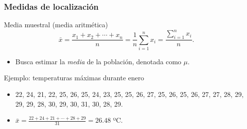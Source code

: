 \documentclass[table]{beamer}
\begin{document}
\begin{frame}
    \frametitle{Medidas de localización}
    \begin{block}{Media muestral (media aritmética)}
        \begin{equation*}
            \bar{x} = \frac{x_{1} + x_{2} + \cdots + x_{n}}{n} = \frac{1}{n} \sum_{i = 1}^{n} x_{i} = \frac{\sum_{i = 1}^{n} x_{i}}{n}.
        \end{equation*}
        \begin{itemize}
            \item Busca estimar la \emph{media} de la población, denotada como $\mu$.
        \end{itemize}
    \end{block}
    \begin{exampleblock}{Ejemplo: temperaturas máximas durante enero}
        \begin{itemize}
            \item 22, 24, 21, 22, 25, 26, 25, 24, 23, 25, 25, 26, 27, 25, 26, 25, 26, 27, 27, 28, 29, 29, 29, 28, 30, 29, 30, 31, 30, 28, 29.
            \item $\bar{x} = \frac{22 + 24 + 21 + \cdots + 28 + 29}{31} = 26.48$ ºC.
        \end{itemize}
    \end{exampleblock}
\end{frame}
\end{document}
